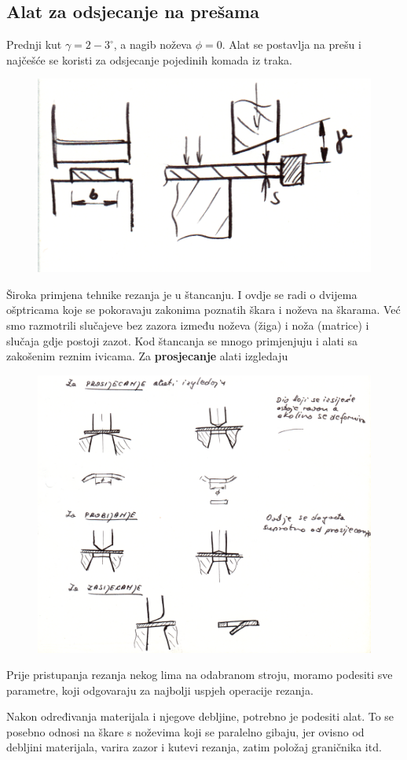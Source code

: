 \documentclass[a4paper,12pt]{article}
\numberwithin{figure}{section}
\begin{document}
\subsection{Alat za odsjecanje na prešama}
Prednji kut $\gamma = 2 - 3^{\circ}$, a nagib noževa $\phi = 0$. Alat se postavlja na prešu i najčešće se koristi za odsjecanje pojedinih komada iz traka.\par
\begin{figure}[!h]
\centering
\includegraphics[scale=0.2]{image_56-1.png}
\end{figure}
\FloatBarrier
Široka primjena tehnike rezanja je u štancanju. I ovdje se radi o dvijema ošptricama koje se pokoravaju zakonima poznatih škara i noževa na škarama. Već smo razmotrili slučajeve bez zazora između noževa (žiga) i noža (matrice) i slučaja gdje postoji zazot. Kod štancanja se mnogo primjenjuju i alati sa zakošenim reznim ivicama. Za \textbf{prosjecanje} alati izgledaju 
\begin{figure}[!h]
\centering
\includegraphics[scale=0.17]{image_56-2.png}
\end{figure}
\FloatBarrier
Prije pristupanja rezanja nekog lima na odabranom stroju, moramo podesiti sve parametre, koji odgovaraju za najbolji uspjeh operacije rezanja. \par
Nakon određivanja materijala i njegove debljine, potrebno je podesiti alat. To se posebno odnosi na škare s noževima koji se paralelno gibaju, jer ovisno od debljini materijala, varira zazor i kutevi rezanja, zatim položaj graničnika itd.
\end{document}
